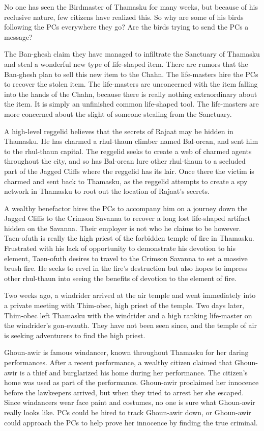 {
	\item No one has seen the Birdmaster of Thamasku for many weeks, but because of his reclusive nature, few citizens have realized this. So why are some of his birds following the PCs everywhere they go? Are the birds trying to send the PCs a message?
	\item The Ban-ghesh claim they have managed to infiltrate the Sanctuary of Thamasku and steal a wonderful new type of life-shaped item. There are rumors that the Ban-ghesh plan to sell this new item to the Chahn. The life-masters hire the PCs to recover the stolen item. The life-masters are unconcerned with the item falling into the hands of the Chahn, because there is really nothing extraordinary about the item. It is simply an unfinished common life-shaped tool. The life-masters are more concerned about the slight of someone stealing from the Sanctuary.
	\item A high-level reggelid believes that the secrets of Rajaat may be hidden in Thamasku. He has charmed a rhul-thaun climber named Bal-orean, and sent him to the rhul-thaun capital. The reggelid seeks to create a web of charmed agents throughout the city, and so has Bal-orean lure other rhul-thaun to a secluded part of the Jagged Cliffs where the reggelid has its lair. Once there the victim is charmed and sent back to Thamasku, as the reggelid attempts to create a spy network in Thamasku to root out the location of Rajaat's secrets.
	\item A wealthy benefactor hires the PCs to accompany him on a journey down the Jagged Cliffs to the Crimson Savanna to recover a long lost life-shaped artifact hidden on the Savanna. Their employer is not who he claims to be however. Taen-ofuth is really the high priest of the forbidden temple of fire in Thamasku. Frustrated with his lack of opportunity to demonstrate his devotion to his element, Taen-ofuth desires to travel to the Crimson Savanna to set a massive brush fire. He seeks to revel in the fire's destruction but also hopes to impress other rhul-thaun into seeing the benefits of devotion to the element of fire.
	\item Two weeks ago, a windrider arrived at the air temple and went immediately into a private meeting with Thim-obec, high priest of the temple. Two days later, Thim-obec left Thamasku with the windrider and a high ranking life-master on the windrider's gon-evauth. They have not been seen since, and the temple of air is seeking adventurers to find the high priest.
	\item Ghoun-awir is famous windancer, known throughout Thamasku for her daring performances. After a recent performance, a wealthy citizen claimed that Ghoun-awir is a thief and burglarized his home during her performance. The citizen's home was used as part of the performance. Ghoun-awir proclaimed her innocence before the lawkeepers arrived, but when they tried to arrest her she escaped. Since windancers wear face paint and costumes, no one is sure what Ghoun-awir really looks like. PCs could be hired to track Ghoun-awir down, or Ghoun-awir could approach the PCs to help prove her innocence by finding the true criminal.
}